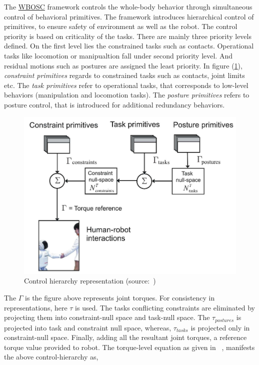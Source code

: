 The \hyperref[wbosc]{WBOSC} framework controls the whole-body behavior through simultaneous control of behavioral primitives. The framework introduces hierarchical control of primitives, to ensure safety of environment as well as the robot. The control priority is based on criticality of the tasks. There are mainly three priority levels defined. On the first level lies the constrained tasks such as contacts. Operational tasks like locomotion or manipualtion fall under second priority level. And residual motions such as postures are assigned the least priority. In figure (\ref{fig:osf}), \textit{constraint primitives} regards to constrained tasks such as contacts, joint limits etc. The \textit{task primitives} refer to operational tasks, that corresponds to low-level behaviors (manipulation and locomotion tasks). The \textit{posture primitives} refers to posture control, that is introduced for additional redundancy behaviors.

\begin{figure}[h!]
	\centering
	\includegraphics[scale=0.35]{images/osf.png}
	\caption{Control hierarchy representation (source:~\cite{sentis2006whole})}
	\label{fig:osf}
\end{figure}


 The $\Gamma$ is the figure above represents joint torques. For consistency in representations, here $\tau$ is used. The tasks conflicting constraints are eliminated by projecting them into constraint-null space and task-null space. The $\tau_{postures}$ is projected into task and constraint null space, whereas, $\tau_{tasks}$ is projected only in constraint-null space. Finally, adding all the resultant joint torques, a reference torque value provided to robot. The torque-level equation as given in ~\cite{sentis2006whole}, manifests the above control-hierarchy as,
 
